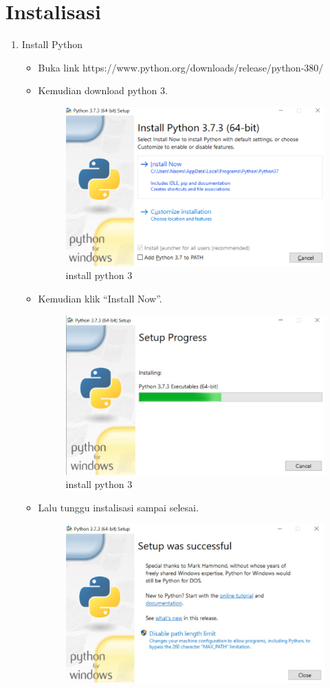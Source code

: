 \section{Instalisasi}
\begin{enumerate}
\item Install Python
\begin{itemize}
\item Buka link https://www.python.org/downloads/release/python-380/
\item Kemudian download python 3.
\begin{figure}[!htbp]
\centering
\includegraphics[width=10cm]{gambar/py1.png}
\caption{install python 3}
\end{figure}
\item Kemudian klik “Install Now”.
\begin{figure}[!htbp]
\centering
\includegraphics[width=10cm]{gambar/py2.jpg}
\caption{install python 3}
\end{figure}
\item Lalu tunggu instalisasi sampai selesai.
\begin{figure}[!htbp]
\centering
\includegraphics[width=10cm]{gambar/py3.jpg}

\end{figure}
\end{itemize}
\end{enumerate}
